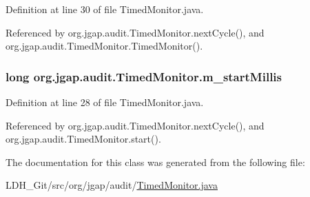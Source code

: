 Definition at line 30 of file Timed\-Monitor.\-java.



Referenced by org.\-jgap.\-audit.\-Timed\-Monitor.\-next\-Cycle(), and org.\-jgap.\-audit.\-Timed\-Monitor.\-Timed\-Monitor().

\hypertarget{classorg_1_1jgap_1_1audit_1_1_timed_monitor_af527bd593ba14f8c8d55d82e54212d1e}{
\subsubsection[{m\-\_\-start\-Millis}]{\setlength{\rightskip}{0pt plus 5cm}long org.\-jgap.\-audit.\-Timed\-Monitor.\-m\-\_\-start\-Millis\hspace{0.3cm}{\ttfamily [private]}}}\label{classorg_1_1jgap_1_1audit_1_1_timed_monitor_af527bd593ba14f8c8d55d82e54212d1e}


Definition at line 28 of file Timed\-Monitor.\-java.



Referenced by org.\-jgap.\-audit.\-Timed\-Monitor.\-next\-Cycle(), and org.\-jgap.\-audit.\-Timed\-Monitor.\-start().



The documentation for this class was generated from the following file\-:\begin{DoxyCompactItemize}
\item 
L\-D\-H\-\_\-\-Git/src/org/jgap/audit/\hyperlink{_timed_monitor_8java}{Timed\-Monitor.\-java}\end{DoxyCompactItemize}
